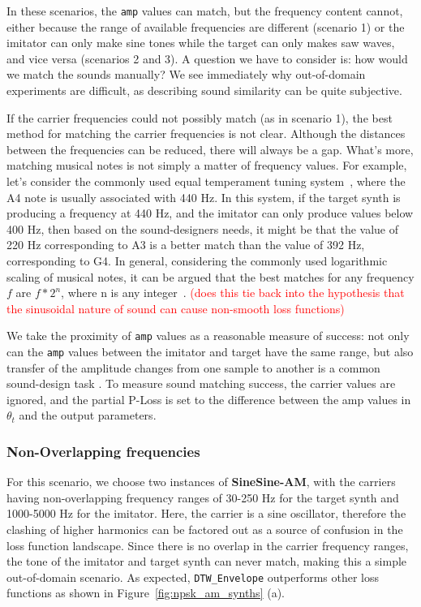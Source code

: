 \documentclass{article} %
\newcommand{\todo}[1]{\textcolor{red}{#1}}
\newcommand{\DTWEnv}{\texttt{DTW\_Envelope}\xspace}
\newcommand{\FMModvtwo}{\textbf{SineSine-AM}\xspace}
\begin{document}
In these scenarios, the \texttt{amp} values can match, but the frequency content cannot, either because the range of available frequencies are different (scenario 1) or the imitator can only make sine tones while the target can only makes saw waves, and vice versa (scenarios 2 and 3). A question we have to consider is: how would we match the sounds manually? We see immediately why out-of-domain experiments are difficult, as describing sound similarity can be quite subjective.

If the carrier frequencies could not possibly match (as in scenario 1), the best method for matching the carrier frequencies is not clear. Although the distances between the frequencies can be reduced, there will always be a gap. What's more, matching musical notes is not simply a matter of frequency values. For example, let's consider the commonly used equal temperament tuning system~\cite{sethares2005tuning}, where the A4 note is usually associated with 440 Hz. In this system, if the target synth is producing a frequency at 440 Hz, and the imitator can only produce values below 400 Hz, then based on the sound-designers needs, it might be that the value of 220 Hz corresponding to A3 is a better match than the value of 392 Hz, corresponding to G4. In general, considering the commonly used logarithmic scaling of musical notes, it can be argued that the best matches for any frequency $f$ are $f*2^{n}$, where n is any integer~\cite{young1939terminology}. \todo{(does this tie back into the hypothesis that the sinusoidal nature of sound can cause non-smooth loss functions)}

We take the proximity of \texttt{amp} values as a reasonable measure of success: not only can the \texttt{amp} values between the imitator and target have the same range, but also transfer of the amplitude changes from one sample to another is a common sound-design task \cite{engel2020ddsp}. To measure sound matching success, the carrier values are ignored, and the partial P-Loss is set to the difference between the amp values in $\theta_t$ and the output parameters.

\subsubsection{Non-Overlapping frequencies}
\label{sec:am_sound_matching_nonoverlapping}
For this scenario, we choose two instances of \FMModvtwo, with the carriers having non-overlapping frequency ranges of 30-250 Hz for the target synth and 1000-5000 Hz for the imitator. Here, the carrier is a sine oscillator, therefore the clashing of higher harmonics can be factored out as a source of confusion in the loss function landscape. Since there is no overlap in the carrier frequency ranges, the tone of the imitator and target synth can never match, making this a simple out-of-domain scenario. As expected, \DTWEnv outperforms other loss functions as shown in Figure~\ref{fig:npsk_am_synths} (a).
\end{document}

